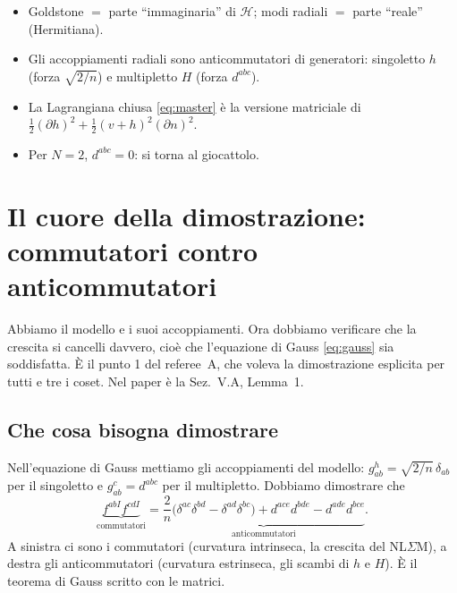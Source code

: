 \documentclass[11pt,a4paper]{article}
\numberwithin{equation}{section}
\theoremstyle{remark}
\newcommand{\Hf}{\mathcal{H}}
\begin{document}
\begin{porta}
\begin{itemize}[nosep]
\item Goldstone $=$ parte ``immaginaria'' di $\Hf$; modi radiali $=$ parte ``reale'' (Hermitiana).
\item Gli accoppiamenti radiali sono anticommutatori di generatori: singoletto $h$ (forza $\sqrt{2/n}$) e multipletto $H$ (forza $d^{abc}$).
\item La Lagrangiana chiusa \eqref{eq:master} è la versione matriciale di $\frac12(\partial h)^2+\frac12(v+h)^2(\partial n)^2$.
\item Per $N=2$, $d^{abc}=0$: si torna al giocattolo.
\end{itemize}
\end{porta}

\section{Il cuore della dimostrazione: commutatori contro anticommutatori}
\label{cap:cuore}

\begin{dove}
Abbiamo il modello e i suoi accoppiamenti. Ora dobbiamo verificare che la crescita si cancelli davvero, cioè che l'equazione di Gauss \eqref{eq:gauss} sia soddisfatta. È il punto 1 del referee~A, che voleva la dimostrazione esplicita per tutti e tre i coset. Nel paper è la Sez.~V.A, Lemma~1.
\end{dove}

\subsection{Che cosa bisogna dimostrare}

Nell'equazione di Gauss mettiamo gli accoppiamenti del modello: $g^h_{ab}=\sqrt{2/n}\,\delta_{ab}$ per il singoletto e $g^c_{ab}=d^{abc}$ per il multipletto. Dobbiamo dimostrare che
\begin{equation}
\underbrace{f^{abI}f^{cdI}}_{\text{commutatori}}=\underbrace{\frac2n\big(\delta^{ac}\delta^{bd}-\delta^{ad}\delta^{bc}\big)+d^{ace}d^{bde}-d^{ade}d^{bce}}_{\text{anticommutatori}} .
\label{eq:lemma}
\end{equation}
A sinistra ci sono i commutatori (curvatura intrinseca, la crescita del NL$\Sigma$M), a destra gli anticommutatori (curvatura estrinseca, gli scambi di $h$ e $H$). È il teorema di Gauss scritto con le matrici.
\end{document}
